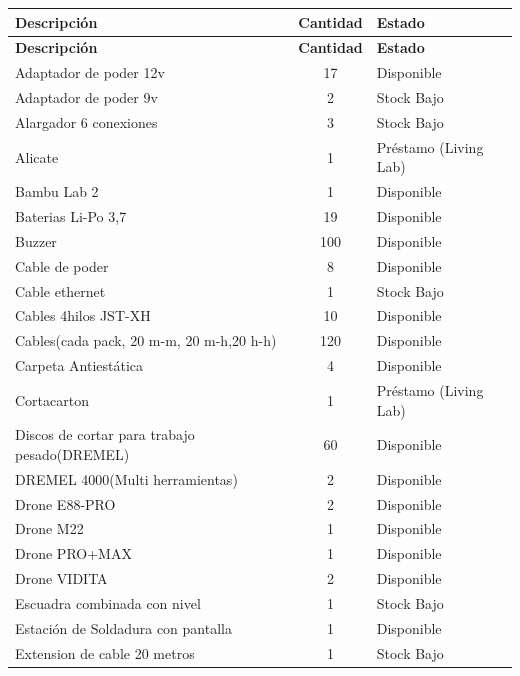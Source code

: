 \begin{longtable}{p{8.5cm} c l}
\toprule
\textbf{Descripción} & \textbf{Cantidad} & \textbf{Estado} \\
\midrule
\endfirsthead
\toprule
\textbf{Descripción} & \textbf{Cantidad} & \textbf{Estado} \\
\midrule
\endhead
\bottomrule
\endfoot
  Adaptador de poder 12v & 17 & \cellcolor{verdeOk} Disponible \\
  Adaptador de poder 9v & 2 & \cellcolor{amarilloAlerta} Stock Bajo \\
  Alargador 6 conexiones & 3 & \cellcolor{amarilloAlerta} Stock Bajo \\
  Alicate & 1 & \cellcolor{azulPrestamo} Préstamo (Living Lab) \\
  Bambu Lab 2 & 1 & \cellcolor{verdeOk} Disponible \\
  Baterias Li-Po 3,7 & 19 & \cellcolor{verdeOk} Disponible \\
  Buzzer & 100 & \cellcolor{verdeOk} Disponible \\
  Cable de poder & 8 & \cellcolor{verdeOk} Disponible \\
  Cable ethernet & 1 & \cellcolor{amarilloAlerta} Stock Bajo \\
  Cables 4hilos JST-XH & 10 & \cellcolor{verdeOk} Disponible \\
  Cables(cada pack, 20 m-m, 20 m-h,20 h-h) & 120 & \cellcolor{verdeOk} Disponible \\
  Carpeta Antiestática & 4 & \cellcolor{verdeOk} Disponible \\
  Cortacarton & 1 & \cellcolor{azulPrestamo} Préstamo (Living Lab) \\
  Discos de cortar para trabajo pesado(DREMEL) & 60 & \cellcolor{verdeOk} Disponible \\
  DREMEL 4000(Multi herramientas) & 2 & \cellcolor{verdeOk} Disponible \\
  Drone E88-PRO & 2 & \cellcolor{verdeOk} Disponible \\
  Drone M22 & 1 & \cellcolor{verdeOk} Disponible \\
  Drone PRO+MAX & 1 & \cellcolor{verdeOk} Disponible \\
  Drone VIDITA & 2 & \cellcolor{verdeOk} Disponible \\
  Escuadra combinada con nivel & 1 & \cellcolor{amarilloAlerta} Stock Bajo \\
  Estación de Soldadura con pantalla & 1 & \cellcolor{verdeOk} Disponible \\
  Extension de cable 20 metros & 1 & \cellcolor{amarilloAlerta} Stock Bajo \\

\end{longtable}
